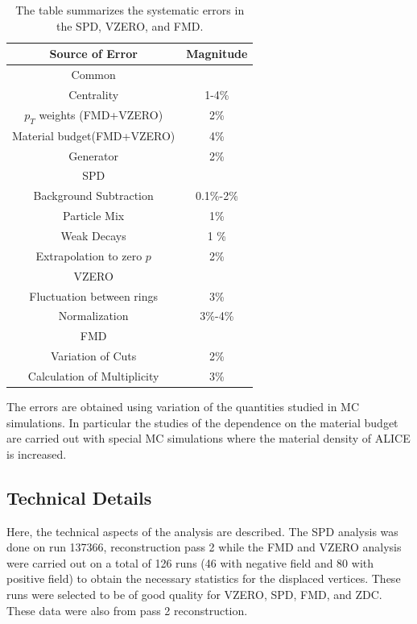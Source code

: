\documentclass[11pt]{article}
\begin{document}
\begin{table} 
  \centering
  \begin{tabular}{|c|c|}
    \hline
    Source of Error & Magnitude   \\
    \hline
    Common   &   \\
    \hline
    Centrality  & 1-4\%    \\
    \hline
    $p_T$ weights (FMD+VZERO)  & 2\%   \\
    \hline
    Material budget(FMD+VZERO)  & 4\%    \\
    \hline
    Generator  & 2\%    \\
    \hline
    SPD   &   \\
    \hline
    Background Subtraction & 0.1\%-2\%    \\
    \hline
    Particle Mix & 1\%   \\
    \hline
    Weak Decays & 1 \%   \\
    \hline
    Extrapolation to zero $p$ & 2\%    \\
    \hline
    VZERO &   \\
    \hline
    Fluctuation between rings & 3\%   \\
    \hline
    Normalization & 3\%-4\%   \\
    \hline
    FMD  &  \\
    \hline
    Variation of Cuts    &  2\%  \\
    \hline
    Calculation of Multiplicity    &  3\%  \\
    \hline
  \end{tabular}
  \caption[Combined Systematic Errors]{The table summarizes the
    systematic errors in the SPD\cite{ruben,Aamodt:2010cz},
    VZERO\cite{maxime}, and FMD\cite{hhd:2009}.} \label{combinedsyst}  
\end{table}

The errors are obtained using variation of the quantities studied in
MC simulations. In particular the studies of the dependence on the
material budget are carried out with special MC simulations where the
material density of ALICE is increased.

\subsection{Technical Details}

Here, the technical aspects of the analysis are described. The SPD
analysis was done on run 137366, reconstruction pass 2 while the FMD
and VZERO analysis were carried out on a total of 126 runs (46 with
negative field and 80 with positive field) to obtain the necessary
statistics for the displaced vertices. These runs were selected to be
of good quality for VZERO, SPD, FMD, and ZDC. These data were also
from pass 2 reconstruction.
\end{document}
